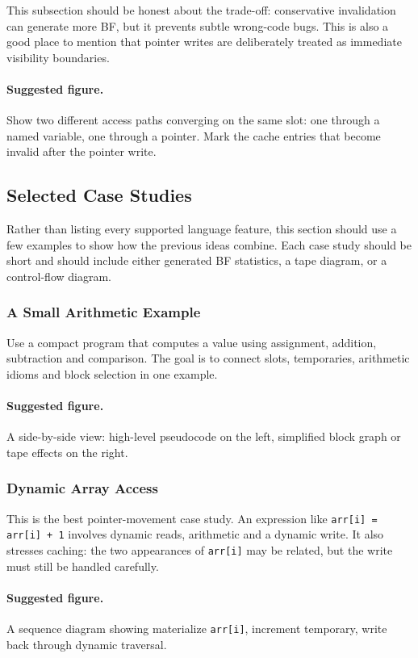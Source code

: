 This subsection should be honest about the trade-off: conservative invalidation can generate more BF, but it prevents subtle wrong-code bugs. This is also a good place to mention that pointer writes are deliberately treated as immediate visibility boundaries.

\paragraph{Suggested figure.}
Show two different access paths converging on the same slot: one through a named variable, one through a pointer. Mark the cache entries that become invalid after the pointer write.

\subsection{Selected Case Studies}
Rather than listing every supported language feature, this section should use a few examples to show how the previous ideas combine. Each case study should be short and should include either generated BF statistics, a tape diagram, or a control-flow diagram.

\subsubsection{A Small Arithmetic Example}
Use a compact program that computes a value using assignment, addition, subtraction and comparison. The goal is to connect slots, temporaries, arithmetic idioms and block selection in one example.

\paragraph{Suggested figure.}
A side-by-side view: high-level pseudocode on the left, simplified block graph or tape effects on the right.

\subsubsection{Dynamic Array Access}
This is the best pointer-movement case study. An expression like \texttt{arr[i] = arr[i] + 1} involves dynamic reads, arithmetic and a dynamic write. It also stresses caching: the two appearances of \texttt{arr[i]} may be related, but the write must still be handled carefully.

\paragraph{Suggested figure.}
A sequence diagram showing materialize \texttt{arr[i]}, increment temporary, write back through dynamic traversal.

